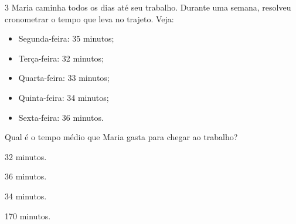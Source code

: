 {{{%









\num{3} Maria caminha todos os dias até seu trabalho. Durante uma semana,
resolveu cronometrar o tempo que leva no trajeto. Veja:

\begin{itemize}
\item Segunda-feira: 35 minutos;

\item Terça-feira: 32 minutos;

\item Quarta-feira: 33 minutos;

\item Quinta-feira: 34 minutos;

\item Sexta-feira: 36 minutos.
\end{itemize}

Qual é o tempo médio que Maria gasta para chegar ao trabalho?

\begin{escolha}[itemsep=0pt]
\item 32 minutos.
\item 36 minutos.
\item 34 minutos.
\item 170 minutos.
\end{escolha}


}}}
